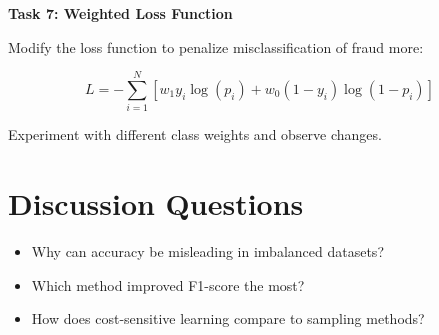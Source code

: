 \documentclass[12pt,a4paper]{article}
\begin{document}
\begin{tcolorbox}
\textbf{Task 7: Weighted Loss Function}

Modify the loss function to penalize misclassification of fraud more:

\[
L = - \sum_{i=1}^{N} \left[ w_1 y_i \log(p_i) + w_0 (1-y_i)\log(1-p_i) \right]
\]

Experiment with different class weights and observe changes.

\vspace{2cm}

\vspace{2cm}
\end{tcolorbox}


\section*{Discussion Questions}

\begin{itemize}
\item Why can accuracy be misleading in imbalanced datasets?
\item Which method improved F1-score the most?
\item How does cost-sensitive learning compare to sampling methods?
\end{itemize}
\end{document}
